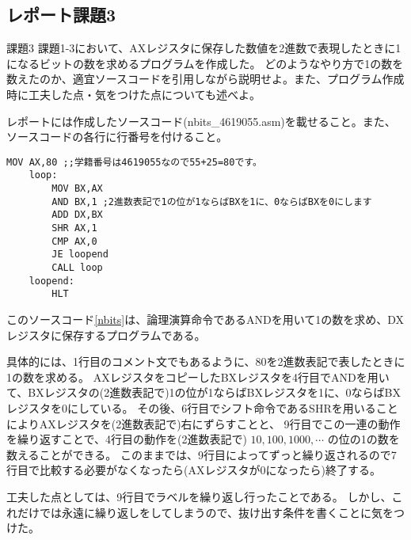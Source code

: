 \documentclass[12pt]{jarticle}
\begin{document}
\subsection{レポート課題3}
\begin{itembox}[l]{課題3}
	課題1-3において、AXレジスタに保存した数値を2進数で表現したときに1になるビットの数を求めるプログラムを作成した。
	どのようなやり方で1の数を数えたのか、適宜ソースコードを引用しながら説明せよ。また、プログラム作成時に工夫した点・気をつけた点についても述べよ。

	レポートには作成したソースコード(nbits\_4619055.asm)を載せること。また、ソースコードの各行に行番号を付けること。
\end{itembox}
\begin{lstlisting}[caption=nbits\_4619055.asm,label=nbits]
	MOV AX,80 ;;学籍番号は4619055なので55+25=80です。
	loop:
		MOV BX,AX
		AND BX,1 ;2進数表記で1の位が1ならばBXを1に、0ならばBXを0にします
		ADD DX,BX
		SHR AX,1
		CMP AX,0
		JE loopend
		CALL loop
	loopend: 
		HLT
\end{lstlisting}

このソースコード\ref{nbits}は、論理演算命令であるANDを用いて1の数を求め、DXレジスタに保存するプログラムである。

具体的には、1行目のコメント文でもあるように、80を2進数表記で表したときに1の数を求める。
AXレジスタをコピーしたBXレジスタを4行目でANDを用いて、BXレジスタの(2進数表記で)1の位が1ならばBXレジスタを1に、0ならばBXレジスタを0にしている。
その後、6行目でシフト命令であるSHRを用いることによりAXレジスタを(2進数表記で)右にずらすことと、
9行目でこの一連の動作を繰り返すことで、4行目の動作を(2進数表記で) $10,100,1000,\cdots$ の位の1の数を数えることができる。
このままでは、9行目によってずっと繰り返されるので7行目で比較する必要がなくなったら(AXレジスタが0になったら)終了する。

工夫した点としては、9行目でラベルを繰り返し行ったことである。
しかし、これだけでは永遠に繰り返しをしてしまうので、抜け出す条件を書くことに気をつけた。
\end{document}
